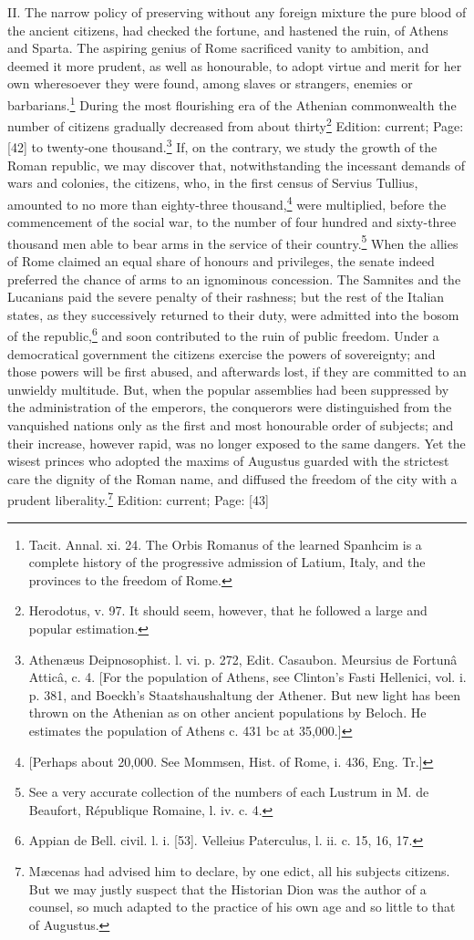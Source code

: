 II. The narrow policy of preserving without any foreign mixture the pure blood of the ancient citizens, had checked the fortune, and hastened the ruin, of Athens and Sparta. The aspiring genius of Rome sacrificed vanity to ambition, and deemed it more prudent, as well as honourable, to adopt virtue and merit for her own wheresoever they were found, among slaves or strangers, enemies or barbarians.\footnote{Tacit. Annal. xi. 24. The Orbis Romanus of the learned Spanhcim is a complete history of the progressive admission of Latium, Italy, and the provinces to the freedom of Rome.} During the most flourishing era of the Athenian commonwealth the number of citizens gradually decreased from about thirty\footnote{Herodotus, v. 97. It should seem, however, that he followed a large and popular estimation.} Edition: current; Page: [42] to twenty-one thousand.\footnote{Athenæus Deipnosophist. l. vi. p. 272, Edit. Casaubon. Meursius de Fortunâ Atticâ, c. 4. [For the population of Athens, see Clinton\texthebrew{}’s Fasti Hellenici, vol. i. p. 381, and Boeckh\texthebrew{}’s Staatshaushaltung der Athener. But new light has been thrown on the Athenian as on other ancient populations by Beloch. He estimates the population of Athens c. 431 bc at 35,000.]} If, on the contrary, we study the growth of the Roman republic, we may discover that, notwithstanding the incessant demands of wars and colonies, the citizens, who, in the first census of Servius Tullius, amounted to no more than eighty-three thousand,\footnote{[Perhaps about 20,000. See Mommsen, Hist. of Rome, i. 436, Eng. Tr.]} were multiplied, before the commencement of the social war, to the number of four hundred and sixty-three thousand men able to bear arms in the service of their country.\footnote{See a very accurate collection of the numbers of each Lustrum in M. de Beaufort, République Romaine, l. iv. c. 4.} When the allies of Rome claimed an equal share of honours and privileges, the senate indeed preferred the chance of arms to an ignominous concession. The Samnites and the Lucanians paid the severe penalty of their rashness; but the rest of the Italian states, as they successively returned to their duty, were admitted into the bosom of the republic,\footnote{Appian de Bell. civil. l. i. [53]. Velleius Paterculus, l. ii. c. 15, 16, 17.} and soon contributed to the ruin of public freedom. Under a democratical government the citizens exercise the powers of sovereignty; and those powers will be first abused, and afterwards lost, if they are committed to an unwieldy multitude. But, when the popular assemblies had been suppressed by the administration of the emperors, the conquerors were distinguished from the vanquished nations only as the first and most honourable order of subjects; and their increase, however rapid, was no longer exposed to the same dangers. Yet the wisest princes who adopted the maxims of Augustus guarded with the strictest care the dignity of the Roman name, and diffused the freedom of the city with a prudent liberality.\footnote{Mæcenas had advised him to declare, by one edict, all his subjects citizens. But we may justly suspect that the Historian Dion was the author of a counsel, so much adapted to the practice of his own age and so little to that of Augustus.}
Edition: current; Page: [43]

